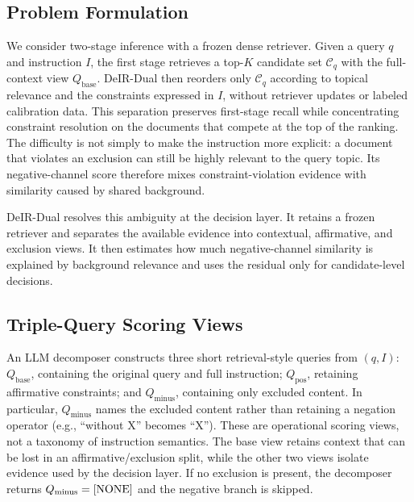 \documentclass[letterpaper]{article}
\newcommand{\method}{DeIR-Dual}
\newcommand{\qbase}{Q_{\text{base}}}
\newcommand{\qpos}{Q_{\text{pos}}}
\newcommand{\qminus}{Q_{\text{minus}}}
\begin{document}

\subsection{Problem Formulation}
\label{sec:problem-formulation}

We consider two-stage inference with a frozen dense retriever.  Given a
query $q$ and instruction $I$, the first stage retrieves a top-$K$
candidate set $\mathcal{C}_q$ with the full-context view $\qbase$.
\method{} then reorders only $\mathcal{C}_q$ according to topical
relevance and the constraints expressed in $I$, without retriever
updates or labeled calibration data.  This separation preserves
first-stage recall while concentrating constraint resolution on the
documents that compete at the top of the ranking.  The difficulty is
not simply to make the instruction more explicit: a document that
violates an exclusion can still be highly relevant to the query topic.
Its negative-channel score therefore mixes constraint-violation evidence
with similarity caused by shared background.

\method{} resolves this ambiguity at the decision layer.  It retains a
frozen retriever and separates the available evidence into contextual,
affirmative, and exclusion views.  It then estimates how much
negative-channel similarity is explained by background relevance and
uses the residual only for candidate-level decisions.

\subsection{Triple-Query Scoring Views}
\label{sec:dual-query-generation}

An LLM decomposer constructs three short retrieval-style queries from
$(q,I)$: $\qbase$, containing the original query and full instruction;
$\qpos$, retaining affirmative constraints; and $\qminus$, containing
only excluded content.  In particular, $\qminus$ names the excluded
content rather than retaining a negation operator (e.g., ``without
X'' becomes ``X'').  These are operational scoring views, not a
taxonomy of instruction semantics.  The base view retains context that
can be lost in an affirmative/exclusion split, while the other two
views isolate evidence used by the decision layer.  If no exclusion is
present, the decomposer returns $\qminus=\textnormal{[NONE]}$ and the
negative branch is skipped.
\end{document}
